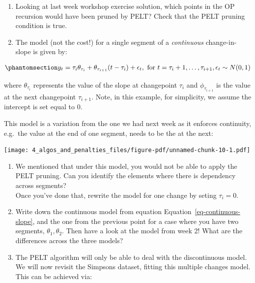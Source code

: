 \documentclass[
  letterpaper,
  DIV=11,
  numbers=noendperiod]{scrreprt}
\begin{document}
\begin{enumerate}
\def\labelenumi{\arabic{enumi}.}
\item
  Looking at last week workshop exercise solution, which points in the
  OP recursion would have been pruned by PELT? Check that the PELT
  pruning condition is true.
\item
  The model (not the cost!) for a single segment of a \emph{continuous}
  change-in-slope is given by:
\end{enumerate}

\begin{equation}\phantomsection\label{eq-continuous-slope}{
    y_t = \tau_i \theta_{\tau_i} + \theta_{\tau_{i+1}} (t - \tau_i) + \epsilon_t, \text{ for } t = \tau_i + 1, \dots, \tau_{i+1}, \epsilon_t \sim N(0, 1)
}\end{equation}

where \(\theta_{\tau_i}\) represents the value of the slope at
changepoint \(\tau_i\) and \(\phi_{\tau_{i+1}}\) is the value at the
next changepoint \(\tau_{i+1}\). Note, in this example, for simplicity,
we assume the intercept is set equal to 0.

This model is a variation from the one we had next week as it enforces
continuity, e.g.~the value at the end of one segment, needs to be the at
the next:

\texttt{[image: 4\_algos\_and\_penalties\_files/figure-pdf/unnamed-chunk-10-1.pdf]}

\begin{enumerate}
\def\labelenumi{\alph{enumi}.}
\item
  We mentioned that under this model, you would not be able to apply the
  PELT pruning. Can you identify the elements where there is dependency
  across segments?\\
  Once you've done that, rewrite the model for one change by seting
  \(\tau_{i} = 0\).
\item
  Write down the continuous model from equation
  Equation~\ref{eq-continuous-slope}, and the one from the previous
  point for a case where you have two segments, \(\theta_1, \theta_2\).
  Then have a look at the model from week 2! What are the differences
  across the three models?
\item
  The PELT algorithm will only be able to deal with the discontinuous
  model. We will now revisit the Simpsons dataset, fitting this multiple
  changes model. This can be achieved via:
\end{enumerate}
\end{document}
